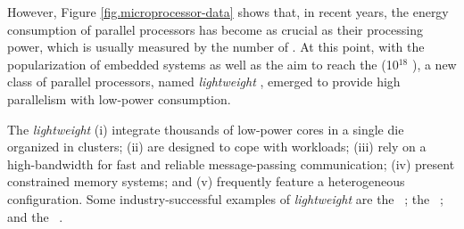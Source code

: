 
	However, Figure \ref{fig.microprocessor-data} shows that, in recent years,
	the energy consumption of parallel processors has become as crucial as their
	processing power, which is usually measured by the number of \flops.
	At this point, with the popularization of embedded systems as well as the aim
	to reach the \exascale (10$^{18}$ \flops), a new class of parallel processors,
	named \textit{lightweight} \manycores, emerged to provide high parallelism
	with low-power consumption.



	The \textit{lightweight} \manycores
		(i) integrate thousands of low-power cores in a single die organized in clusters;
		(ii) are designed to cope with \mimd workloads;
		(iii) rely on a high-bandwidth \noc for fast and reliable message-passing communication;
		(iv) present constrained memory systems; and
		(v) frequently feature a heterogeneous configuration.
	Some industry-successful examples of \textit{lightweight} \manycores are
	the \mppa~\cite{DeDinechin2013-1};
	the \epiphany~\cite{olofsson2014}; and
	the \taihulight~\cite{zheng2015}.

